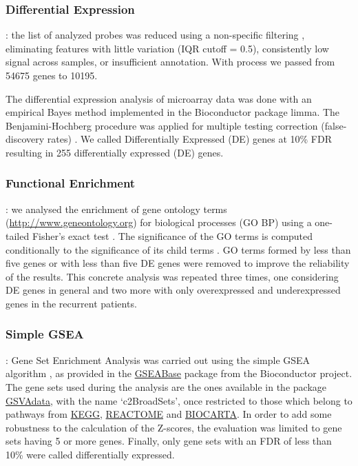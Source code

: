 \documentclass[9pt,twocolumn,twoside]{gsajnl}
\begin{document}
\subsubsection*{Differential Expression}: the list of analyzed probes was reduced using a non-specific filtering \citep{Bourgon2010}, eliminating features with little variation (IQR cutoff = 0.5), consistently low signal across samples, or insufficient annotation. With process we passed from 54675 genes to 10195.

The differential expression analysis of microarray data was done with an empirical Bayes method \citep{Smyth2004} implemented in the Bioconductor package limma. The Benjamini-Hochberg procedure was applied for multiple testing correction (false-discovery rates) \citep{Benjamini1995}. We called Differentially Expressed (DE) genes at 10\% FDR resulting in 255 differentially expressed (DE) genes.

\subsubsection*{Functional Enrichment}: we analysed the enrichment of gene ontology terms (\url{http://www.geneontology.org}) for biological processes (GO BP) using a one-tailed Fisher's exact test \citep{Fisher1922}. The significance of the GO terms is computed conditionally to the significance of its child terms \citep{Alexa2006}. GO terms formed by less than five genes or with less than five DE genes were removed to improve the reliability of the results. This concrete analysis was repeated three times, one considering DE genes in general and two more with only overexpressed and underexpressed genes in the recurrent patients. 

\subsubsection*{Simple GSEA}: Gene Set Enrichment Analysis \citep{Subramanian2005} was carried out using the simple GSEA algorithm \citep{Irizarry2009}, as provided in the \href{http://www.bioconductor.org/packages/release/bioc/html/GSEABase.html}{GSEABase} package from the Bioconductor project. The gene sets used during the analysis are the ones available in the package \href{http://www.bioconductor.org/packages/release/data/experiment/html/GSVAdata.html}{GSVAdata}, with the name `c2BroadSets', once restricted to those which belong to pathways from \href{http://www.genome.jp/kegg/pathway.html}{KEGG}, \href{http://www.reactome.org/}{REACTOME} and \href{http://www.biocarta.com/}{BIOCARTA}. In order to add some robustness to the calculation of the Z-scores, the evaluation was limited to gene sets having 5 or more genes. Finally, only gene sets with an FDR of less than 10\% were called differentially expressed.
\end{document}
